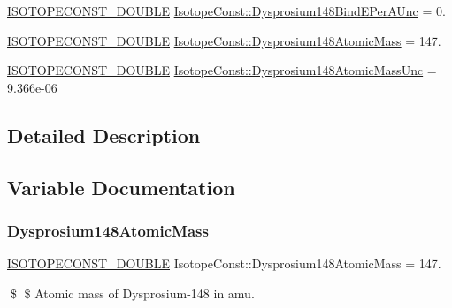 \begin{DoxyCompactItemize}
\mbox{\hyperlink{group___isotope_const-_macros_ga8f45a7272ce02c0b4c65c44636ed719a}{I\+S\+O\+T\+O\+P\+E\+C\+O\+N\+S\+T\+\_\+\+D\+O\+U\+B\+LE}} \mbox{\hyperlink{group___isotope_const-_dysprosium-_dy148_gacc537bfbf5f9ff2a8914c49eb002b071}{Isotope\+Const\+::\+Dysprosium148\+Bind\+E\+Per\+A\+Unc}} = 0.
\item 
\mbox{\hyperlink{group___isotope_const-_macros_ga8f45a7272ce02c0b4c65c44636ed719a}{I\+S\+O\+T\+O\+P\+E\+C\+O\+N\+S\+T\+\_\+\+D\+O\+U\+B\+LE}} \mbox{\hyperlink{group___isotope_const-_dysprosium-_dy148_ga390b968c03121606920b216552be24f8}{Isotope\+Const\+::\+Dysprosium148\+Atomic\+Mass}} = 147.
\item 
\mbox{\hyperlink{group___isotope_const-_macros_ga8f45a7272ce02c0b4c65c44636ed719a}{I\+S\+O\+T\+O\+P\+E\+C\+O\+N\+S\+T\+\_\+\+D\+O\+U\+B\+LE}} \mbox{\hyperlink{group___isotope_const-_dysprosium-_dy148_ga0bd374b4b37aae29dd55ec8b00a36a5d}{Isotope\+Const\+::\+Dysprosium148\+Atomic\+Mass\+Unc}} = 9.\+366e-\/06
\end{DoxyCompactItemize}


\subsection{Detailed Description}


\subsection{Variable Documentation}
\mbox{\label{group___isotope_const-_dysprosium-_dy148_ga390b968c03121606920b216552be24f8}} 
\subsubsection{\texorpdfstring{Dysprosium148\+Atomic\+Mass}{Dysprosium148AtomicMass}}
{\footnotesize\ttfamily \mbox{\hyperlink{group___isotope_const-_macros_ga8f45a7272ce02c0b4c65c44636ed719a}{I\+S\+O\+T\+O\+P\+E\+C\+O\+N\+S\+T\+\_\+\+D\+O\+U\+B\+LE}} Isotope\+Const\+::\+Dysprosium148\+Atomic\+Mass = 147.}

\$ \$ Atomic mass of Dysprosium-\/148 in amu. \mbox{\label{group___isotope_const-_dysprosium-_dy148_ga0bd374b4b37aae29dd55ec8b00a36a5d}} 
